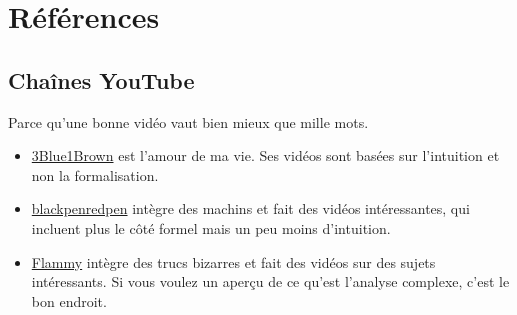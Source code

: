 \documentclass{article}
\begin{document}

\section{Références}

\subsection{Chaînes YouTube}
Parce qu'une bonne vidéo vaut bien mieux que mille mots.
\begin{itemize}
	\item \href{https://www.youtube.com/channel/UCYO_jab_esuFRV4b17AJtAw}{3Blue1Brown} est l'amour de ma vie. Ses vidéos sont basées sur l'intuition et non la formalisation.
	\item \href{https://www.youtube.com/user/blackpenredpen}{blackpenredpen} intègre des machins et fait des vidéos intéressantes, qui incluent plus le côté formel mais un peu moins d'intuition.
	\item \href{https://www.youtube.com/channel/UCtAIs1VCQrymlAnw3mGonhw}{Flammy} intègre des trucs bizarres et fait des vidéos sur des sujets intéressants. Si vous voulez un aperçu de ce qu'est l'analyse complexe, c'est le bon endroit.
\end{itemize}
\end{document}
